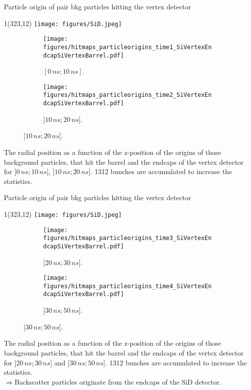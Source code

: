 \documentclass[xcolor={dvipsnames}]{beamer}
\newcommand{\sidlogo}{
  \setlength{\TPHorizModule}{1pt}
  \setlength{\TPVertModule}{1pt}
  \begin{textblock}{1}(323,12)
   \texttt{[image: figures/SiD.jpeg]}
  \end{textblock}
  }
\begin{document}
\begin{frame}{Particle origin of pair bkg particles hitting the vertex detector}
\sidlogo
 \begin{figure}
\begin{subfigure}[t]{0.49\textwidth}
\centering
\texttt{[image: figures/hitmaps\_particleorigins\_time1\_SiVertexEndcapSiVertexBarrel.pdf]}
\caption{$[0\,ns;10\,ns]$.}
\end{subfigure}
\begin{subfigure}[t]{0.49\textwidth}
\centering
\texttt{[image: figures/hitmaps\_particleorigins\_time2\_SiVertexEndcapSiVertexBarrel.pdf]}
\caption{$]10\,ns;20\,ns]$.}
\end{subfigure}
\end{figure}
\footnotesize The radial position as a function of the z-position of the origins of those background particles, that hit the barrel and the endcaps of the vertex detector for $]0\,ns;10\,ns]$, $]10\,ns;20\,ns]$. 1312 bunches are accumulated to increase the statistics.
\end{frame}

\begin{frame}{Particle origin of pair bkg particles hitting the vertex detector}
\sidlogo
 \begin{figure}
\begin{subfigure}[t]{0.49\textwidth}
\centering
\texttt{[image: figures/hitmaps\_particleorigins\_time3\_SiVertexEndcapSiVertexBarrel.pdf]}
\caption{$]20\,ns;30\,ns]$.}
\end{subfigure}
\begin{subfigure}[t]{0.49\textwidth}
\centering
\texttt{[image: figures/hitmaps\_particleorigins\_time4\_SiVertexEndcapSiVertexBarrel.pdf]}
\caption{$]30\,ns;50\,ns]$.}
\end{subfigure}
\end{figure}
\footnotesize The radial position as a function of the z-position of the origins of those background particles, that hit the barrel and the endcaps of the vertex detector for $]20\,ns;30\,ns]$ and $]30\,ns;50\,ns]$. 1312 bunches are accumulated to increase the statistics.\\
\normalsize $\Rightarrow$Backscatter particles originate from the endcaps of the SiD detector.
\end{frame}
\end{document}
